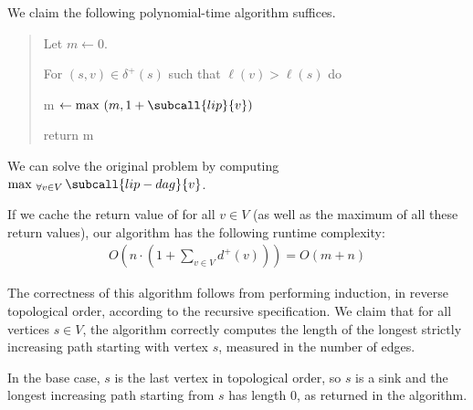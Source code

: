 \documentclass{article}
\begin{document}
\begin{solution}
We claim the following polynomial-time algorithm suffices.

\begin{quote}%


\begin{steps}
  \item Let $m \leftarrow 0$.
  \item For $(s,v)\in \delta^+(s)$ such that $\ell(v) > \ell(s)$ do
    \begin{steps}
        \item m $\leftarrow \max \ (m, 1 + \subcall{lip}{v})$
    \end{steps}
  \item return m
\end{steps}
\end{quote}

We can solve the original problem by computing \(\max_{ \ \forall v\in V}\subcall{lip-dag}{v}\).

\begin{subproof}[Runtime]
If we cache the return value of  for all $v \in V$ (as well as the maximum of all these return values), our algorithm has the following runtime complexity:
\begin{align*}
    O \left( n \cdot \left( 1+\sum_{v\in V} d^+(v) \right) \right) = O \left( m+n \right)
\end{align*}


\end{subproof}

\begin{subproof}[Correctness]
The correctness of this algorithm follows from performing induction, in reverse topological order, according to the recursive specification. We claim that for all vertices $s \in V$, the algorithm correctly computes the length of the longest strictly increasing path starting with vertex $s$, measured in the number of edges.

In the base case, $s$ is the last vertex in topological order, so $s$ is a sink and the longest increasing path starting from $s$ has length 0, as returned in the algorithm.


\end{subproof}
\end{solution}
\end{document}
